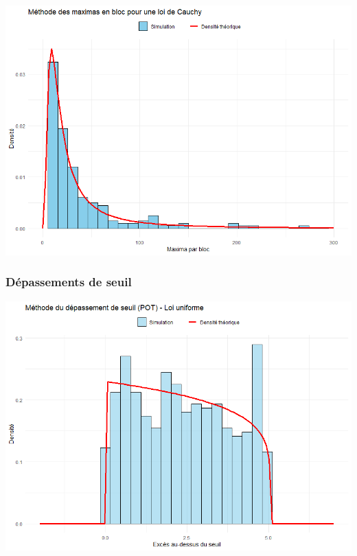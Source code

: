 \documentclass{article}
\theoremstyle{plain}
\theoremstyle{definition}
\theoremstyle{plain}
\begin{document}
\begin{center}
	\includegraphics[scale=0.60]{./images/MB_Cauchy} 
\end{center}

\subsubsection{Dépassements de seuil}

\begin{center}
	\includegraphics[scale=0.60]{./images/DS_Uniforme} 
\end{center}
\end{document}
